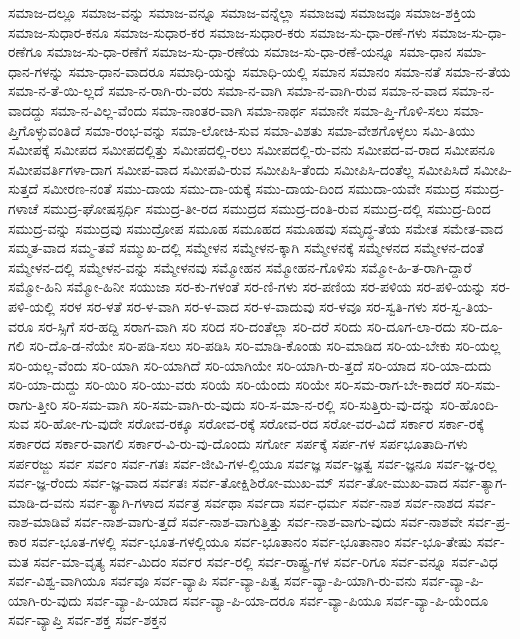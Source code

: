 {ಸಮಾಜ-ದಲ್ಲೂ
ಸಮಾಜ-ವನ್ನು
ಸಮಾಜ-ವನ್ನೂ
ಸಮಾಜ-ವನ್ನೆಲ್ಲಾ
ಸಮಾಜವು
ಸಮಾಜವೂ
ಸಮಾಜ-ಶಕ್ತಿಯ
ಸಮಾಜ-ಸುಧಾರ-ಕನೂ
ಸಮಾಜ-ಸುಧಾರ-ಕರ
ಸಮಾಜ-ಸುಧಾರ-ಕರು
ಸಮಾಜ-ಸು-ಧಾ-ರಣೆ-ಗಳು
ಸಮಾಜ-ಸು-ಧಾ-ರಣೆಗೂ
ಸಮಾಜ-ಸು-ಧಾ-ರಣೆಗೆ
ಸಮಾಜ-ಸು-ಧಾ-ರಣೆಯ
ಸಮಾಜ-ಸು-ಧಾ-ರಣೆ-ಯನ್ನೂ
ಸಮಾ-ಧಾನ
ಸಮಾ-ಧಾನ-ಗಳನ್ನು
ಸಮಾ-ಧಾನ-ವಾದರೂ
ಸಮಾಧಿ-ಯನ್ನು
ಸಮಾಧಿ-ಯಲ್ಲಿ
ಸಮಾನ
ಸಮಾನಂ
ಸಮಾ-ನತೆ
ಸಮಾ-ನ-ತೆಯ
ಸಮಾ-ನ-ತೆ-ಯಿ-ಲ್ಲದೆ
ಸಮಾ-ನ-ರಾಗಿ-ರು-ವರು
ಸಮಾ-ನ-ವಾಗಿ
ಸಮಾ-ನ-ವಾಗಿ-ರುವ
ಸಮಾ-ನ-ವಾದ
ಸಮಾ-ನ-ವಾದದ್ದು
ಸಮಾ-ನ-ವಿಲ್ಲ-ವೆಂದು
ಸಮಾ-ನಾಂತರ-ವಾಗಿ
ಸಮಾ-ನಾರ್ಥ
ಸಮಾನೇ
ಸಮಾ-ಪ್ತಿ-ಗೊಳಿ-ಸಲು
ಸಮಾ-ಪ್ತಿಗೊಳ್ಳುವಂತಿದೆ
ಸಮಾ-ರಂಭ-ವನ್ನು
ಸಮಾ-ಲೋಚಿ-ಸುವ
ಸಮಾ-ವಿಶತು
ಸಮಾ-ವೇಶಗೊಳ್ಳಲು
ಸಮಿ-ತಿಯು
ಸಮೀಪಕ್ಕೆ
ಸಮೀಪದ
ಸಮೀಪದಲ್ಲಿತ್ತು
ಸಮೀಪದಲ್ಲಿ-ರಲು
ಸಮೀಪದಲ್ಲಿ-ರು-ವನು
ಸಮೀಪದ-ವ-ರಾದ
ಸಮೀಪನೂ
ಸಮೀಪವರ್ತಿಗಳಾ-ದಾಗ
ಸಮೀಪ-ವಾದ
ಸಮೀಪವಿ-ರುವ
ಸಮೀಪಿಸಿ-ತೆಂದು
ಸಮೀಪಿಸಿ-ದಂತೆಲ್ಲ
ಸಮೀಪಿಸಿದೆ
ಸಮೀಪಿ-ಸುತ್ತದೆ
ಸಮೀರಣ-ನಂತೆ
ಸಮು-ದಾಯ
ಸಮು-ದಾ-ಯಕ್ಕೆ
ಸಮು-ದಾಯ-ದಿಂದ
ಸಮುದಾ-ಯವೇ
ಸಮುದ್ರ
ಸಮುದ್ರ-ಗಳಾಚೆ
ಸಮುದ್ರ-ಘೋಷಸ್ಪರ್ಧಿ
ಸಮುದ್ರ-ತೀ-ರದ
ಸಮುದ್ರದ
ಸಮುದ್ರ-ದಂತಿ-ರುವ
ಸಮುದ್ರ-ದಲ್ಲಿ
ಸಮುದ್ರ-ದಿಂದ
ಸಮುದ್ರ-ವನ್ನು
ಸಮುದ್ರವು
ಸಮುದ್ರೋಪ
ಸಮೂಹ
ಸಮೂಹದ
ಸಮೂಹವು
ಸಮೃದ್ಧ-ತೆಯ
ಸಮೇತ
ಸಮೇತ-ವಾದ
ಸಮ್ಮತ-ವಾದ
ಸಮ್ಮ-ತವೆ
ಸಮ್ಮುಖ-ದಲ್ಲಿ
ಸಮ್ಮೇಳನ
ಸಮ್ಮೇಳನ-ಕ್ಕಾಗಿ
ಸಮ್ಮೇಳನಕ್ಕೆ
ಸಮ್ಮೇಳನದ
ಸಮ್ಮೇಳನ-ದಂತೆ
ಸಮ್ಮೇಳನ-ದಲ್ಲಿ
ಸಮ್ಮೇಳನ-ವನ್ನು
ಸಮ್ಮೇಳನವು
ಸಮ್ಮೋಹನ
ಸಮ್ಮೋಹನ-ಗೊಳಿಸು
ಸಮ್ಮೋ-ಹಿ-ತ-ರಾಗಿ-ದ್ದಾರೆ
ಸಮ್ಮೋ-ಹಿನಿ
ಸಮ್ಮೋ-ಹಿನೀ
ಸಯುಜಾ
ಸರ-ಕು-ಗಳಂತೆ
ಸರ-ಣಿ-ಗಳು
ಸರ-ಪಣಿಯ
ಸರ-ಪಳಿಯ
ಸರ-ಪಳಿ-ಯನ್ನು
ಸರ-ಪಳಿ-ಯಲ್ಲಿ
ಸರಳ
ಸರ-ಳತೆ
ಸರ-ಳ-ವಾಗಿ
ಸರ-ಳ-ವಾದ
ಸರ-ಳ-ವಾದುವು
ಸರ-ಳವೂ
ಸರ-ಸ್ವತಿ-ಗಳು
ಸರ-ಸ್ವ-ತಿಯ-ವರೂ
ಸರ-ಸ್ಸಿಗೆ
ಸರ-ಹದ್ದಿ
ಸರಾಗ-ವಾಗಿ
ಸರಿ
ಸರಿದ
ಸರಿ-ದಂತೆಲ್ಲಾ
ಸರಿ-ದರೆ
ಸರಿದು
ಸರಿ-ದೂಗ-ಲಾ-ರದು
ಸರಿ-ದೂ-ಗಲಿ
ಸರಿ-ದೊ-ಡ-ನೆಯೇ
ಸರಿ-ಪಡಿ-ಸಲು
ಸರಿ-ಪಡಿಸಿ
ಸರಿ-ಮಾಡಿ-ಕೊಂಡು
ಸರಿ-ಮಾಡಿದ
ಸರಿ-ಯ-ಬೇಕು
ಸರಿ-ಯಲ್ಲ
ಸರಿ-ಯಲ್ಲ-ವೆಂದು
ಸರಿ-ಯಾಗಿ
ಸರಿ-ಯಾಗಿದೆ
ಸರಿ-ಯಾಗಿಯೇ
ಸರಿ-ಯಾಗಿ-ರು-ತ್ತದೆ
ಸರಿ-ಯಾದ
ಸರಿ-ಯಾ-ದುದು
ಸರಿ-ಯಾ-ದುದ್ದು
ಸರಿ-ಯಿರಿ
ಸರಿ-ಯು-ವರು
ಸರಿಯೆ
ಸರಿ-ಯೆಂದು
ಸರಿಯೇ
ಸರಿ-ಸಮ-ರಾಗ-ಬೇ-ಕಾದರೆ
ಸರಿ-ಸಮ-ರಾಗು-ತ್ತೀರಿ
ಸರಿ-ಸಮ-ವಾಗಿ
ಸರಿ-ಸಮ-ವಾಗಿ-ರು-ವುದು
ಸರಿ-ಸ-ಮಾ-ನ-ರಲ್ಲಿ
ಸರಿ-ಸುತ್ತಿರು-ವು-ದನ್ನು
ಸರಿ-ಹೊಂದಿ-ಸುವ
ಸರಿ-ಹೋ-ಗು-ವುದೇ
ಸರೋವ-ರಕ್ಕೂ
ಸರೋವ-ರಕ್ಕೆ
ಸರೋವ-ರದ
ಸರೋ-ವರ-ವಿದೆ
ಸರ್ಕಾರ
ಸರ್ಕಾ-ರಕ್ಕೆ
ಸರ್ಕಾರದ
ಸರ್ಕಾರ-ವಾಗಲಿ
ಸರ್ಕಾರ-ವಿ-ರು-ವು-ದೊಂದು
ಸರ್ಗೋ
ಸರ್ಪಕ್ಕೆ
ಸರ್ಪ-ಗಳ
ಸರ್ಪಭೂತಾದಿ-ಗಳು
ಸರ್ಪರಜ್ಜು
ಸರ್ವ
ಸರ್ವಂ
ಸರ್ವ-ಗತಃ
ಸರ್ವ-ಜೀವಿ-ಗಳ-ಲ್ಲಿಯೂ
ಸರ್ವಜ್ಞ
ಸರ್ವ-ಜ್ಞತ್ವ
ಸರ್ವ-ಜ್ಞನೂ
ಸರ್ವ-ಜ್ಞ-ರಲ್ಲ
ಸರ್ವ-ಜ್ಞ-ರೆಂದು
ಸರ್ವ-ಜ್ಞ-ವಾದ
ಸರ್ವತಃ
ಸರ್ವ-ತೋಕ್ಷಿಶಿರೋ-ಮುಖ-ಮ್
ಸರ್ವ-ತೋ-ಮುಖ-ವಾದ
ಸರ್ವ-ತ್ಯಾಗ-ಮಾಡಿ-ದ-ವನು
ಸರ್ವ-ತ್ಯಾಗಿ-ಗಳಾದ
ಸರ್ವತ್ರ
ಸರ್ವಥಾ
ಸರ್ವದಾ
ಸರ್ವ-ಧರ್ಮ
ಸರ್ವ-ನಾಶ
ಸರ್ವ-ನಾಶದ
ಸರ್ವ-ನಾಶ-ಮಾಡಿವೆ
ಸರ್ವ-ನಾಶ-ವಾಗು-ತ್ತದೆ
ಸರ್ವ-ನಾಶ-ವಾಗುತ್ತಿತ್ತು
ಸರ್ವ-ನಾಶ-ವಾಗು-ವುದು
ಸರ್ವ-ನಾಶವೇ
ಸರ್ವ-ಪ್ರ-ಕಾರ
ಸರ್ವ-ಭೂತ-ಗಳಲ್ಲಿ
ಸರ್ವ-ಭೂತ-ಗಳಲ್ಲಿಯೂ
ಸರ್ವ-ಭೂತಾನಂ
ಸರ್ವ-ಭೂತಾನಾಂ
ಸರ್ವ-ಭೂ-ತೇಷು
ಸರ್ವ-ಮತ
ಸರ್ವ-ಮಾ-ವೃತ್ಯ
ಸರ್ವ-ಮಿದಂ
ಸರ್ವರ
ಸರ್ವ-ರಲ್ಲಿ
ಸರ್ವ-ರಾಷ್ಟ್ರ-ಗಳ
ಸರ್ವ-ರಿಗೂ
ಸರ್ವ-ವನ್ನೂ
ಸರ್ವ-ವಿಧ
ಸರ್ವ-ವಿಶ್ವ-ವಾಗಿಯೂ
ಸರ್ವವೂ
ಸರ್ವ-ವ್ಯಾಪಿ
ಸರ್ವ-ವ್ಯಾ-ಪಿತ್ವ
ಸರ್ವ-ವ್ಯಾ-ಪಿ-ಯಾಗಿ-ರು-ವನು
ಸರ್ವ-ವ್ಯಾ-ಪಿ-ಯಾಗಿ-ರು-ವುದು
ಸರ್ವ-ವ್ಯಾ-ಪಿ-ಯಾದ
ಸರ್ವ-ವ್ಯಾ-ಪಿ-ಯಾ-ದರೂ
ಸರ್ವ-ವ್ಯಾ-ಪಿಯೂ
ಸರ್ವ-ವ್ಯಾ-ಪಿ-ಯೆಂದೂ
ಸರ್ವ-ವ್ಯಾಪ್ತಿ
ಸರ್ವ-ಶಕ್ತ
ಸರ್ವ-ಶಕ್ತನ
}
